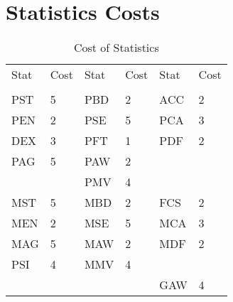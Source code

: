 \section{Statistics Costs}

\begin{table}[h]
\centering
\caption{Cost of Statistics}
	\begin{tabular}{llllll} \hline
    Stat & Cost	&	Stat& Cost	& Stat	& Cost \\ 
         & 		\\ \hline
	PST  & 5	&	PBD	&	2	&	ACC	&	2	\\
	PEN  & 2 	&	PSE	&	5	&	PCA	&	3	\\
	DEX  & 3	&	PFT	&	1	&	PDF	&	2	\\
	PAG  & 5	&	PAW	&	2	&		&		\\ 
		 & 		&	PMV	&	4	&		&		\\ \hline
	MST  & 5	&	MBD	&	2	&	FCS	&	2	\\
	MEN  & 2	&	MSE	&	5	&	MCA	&	3	\\
	MAG  & 5	&	MAW	&	2	&	MDF	&	2	\\
	PSI  & 4	&	MMV	&	4	&		&		\\ 
		 &		&		&		&	GAW	&	4	\\ \hline
	\end{tabular}
\end{table}


